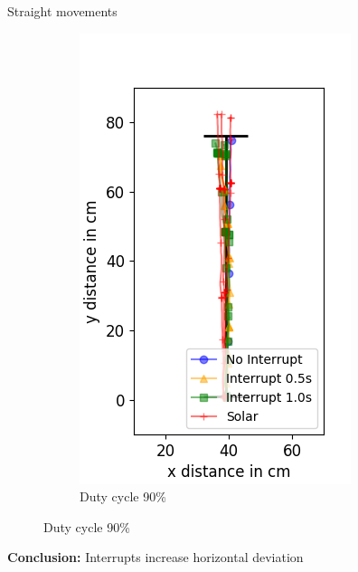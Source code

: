 \documentclass{beamer}
\begin{document}
\begin{frame}{Straight movements}
\begin{figure}
\begin{subfigure}[b]{0.28\textwidth}
			\includegraphics[width=\textwidth]{pics/straight_90.png}
			\caption*{Duty cycle 90\%}
		\end{subfigure}
	\end{figure}
	\pause
	\textbf{Conclusion:} Interrupts increase horizontal deviation
\end{frame}
\end{document}
